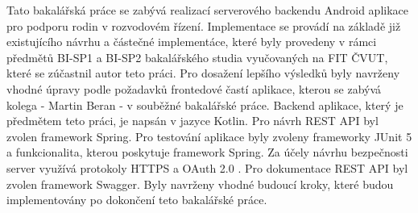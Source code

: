 Tato bakalářská práce se zabývá realizací serverového backendu Android aplikace pro podporu rodin v rozvodovém řízení. Implementace se provádí na základě již existujícího návrhu a částečné implementáce, které byly provedeny v rámci předmětů BI-SP1 a BI-SP2 bakalářského studia vyučovaných na FIT ČVUT, které se zúčastnil autor teto práci. Pro dosažení lepšího výsledků byly navrženy vhodné úpravy podle požadavků frontedové častí aplikace, kterou se zabývá kolega - Martin Beran - v souběžné bakalářské práce. Backend aplikace, který je předmětem teto práci, je napsán v jazyce Kotlin. Pro návrh REST API byl zvolen framework Spring. Pro testování aplikace byly zvoleny frameworky JUnit 5 a funkcionalita, kterou poskytuje framework Spring. Za účely návrhu bezpečnosti server využívá protokoly HTTPS a OAuth 2.0 . Pro dokumentace REST API byl zvolen framework Swagger. Byly navrženy vhodné budoucí kroky, které budou implementovány po dokončení teto bakalářské práce.
